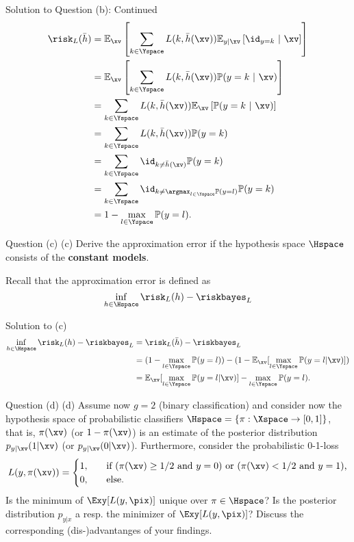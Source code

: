 \documentclass[aspectratio=169]{beamer}
\newcommand{\Ex}{\mathbb{E}_{\xv}}
\newcommand{\Eyx}{\mathbb{E}_{y|\xv}}
\newcommand{\Prob}{\mathbb{P}}
\begin{document}
\begin{frame}{Solution to Question (b): Continued}
	\small
	\begin{align*}
		\risk_L(\bar{h})
		&= \Ex\left[ \sum_{k \in \Yspace} L(k, \bar{h}(\xv)) \Eyx \left[\id_{y=k}  \ | \ \xv \right] \right] \\
		&= \Ex\left[ \sum_{k \in \Yspace} L(k, \bar{h}(\xv)) \Prob(y = k \ | \ \xv) \right] \\
		&= \sum_{k \in \Yspace} L(k, \bar{h}(\xv)) \Ex \left[ \Prob(y = k \ | \ \xv) \right] \\
		& = \sum_{k \in \Yspace} L(k, \bar{h}(\xv)) \Prob(y = k) \\
		&= \sum_{k \in \Yspace} \id_{k \neq \bar{h}(\xv)} \Prob(y=k) \\
		&=  \sum_{k \in \Yspace} \id_{k \neq \argmax_{l \in \Yspace} \Prob(y=l)} \Prob(y=k) \\
		&= 1 - \max_{l \in \Yspace} \Prob(y=l).
	\end{align*}
\end{frame}

\begin{frame}{Question (c)}
	(c) Derive the approximation error if the hypothesis space $\Hspace$ consists of the \textbf{constant models}.
	\vspace{10pt}
	
	Recall that the approximation error is defined as 
	$$\inf_{h \in \Hspace} \risk_L(h) - \riskbayes_L$$
\end{frame}

\begin{frame}{Solution to (c)}
	\begin{align*}
		\inf_{h \in \Hspace} \risk_L(h) - \riskbayes_L 
		&= \risk_L(\bar{h}) - \riskbayes_L \\
		&= (1 - \max_{l \in \Yspace} \Prob(y=l)) - (1 - \Ex[\max_{l \in \Yspace} \Prob(y = l | \xv)]) \\
		&= \Ex[\max_{l \in \Yspace} \Prob(y = l | \xv)] - \max_{l \in \Yspace} \Prob(y=l).
	\end{align*}
\end{frame}

\begin{frame}{Question (d)}
	(d) Assume now $g=2$ (binary classification) and consider now the hypothesis space of probabilistic classifiers $\Hspace = \{\pi: \Xspace \to [0, 1] \}$, that is, $\pi(\xv)$ (or $1 - \pi(\xv)$) is an estimate of the posterior distribution $p_{y | \xv} (1 | \xv)$ (or $p_{y | \xv} (0 | \xv)$). Furthermore, consider the probabilistic 0-1-loss
	$$
	L(y, \pi(\xv)) = \begin{cases}
		1, \quad & \text{if ($\pi(\xv) \geq 1/2$ and $y=0$) or ($\pi(\xv) < 1/ 2$ and $y = 1$),} \\
		0, \quad & \text{else.}
	\end{cases}
	$$
	Is the minimum of $\Exy[L(y, \pix)]$ unique over $\pi \in \Hspace$? Is the posterior distribution $p_{y|x}$ a resp. the minimizer of $\Exy[L(y, \pix)]$? Discuss the corresponding (dis-)advantanges of your findings.
\end{frame}
\end{document}
